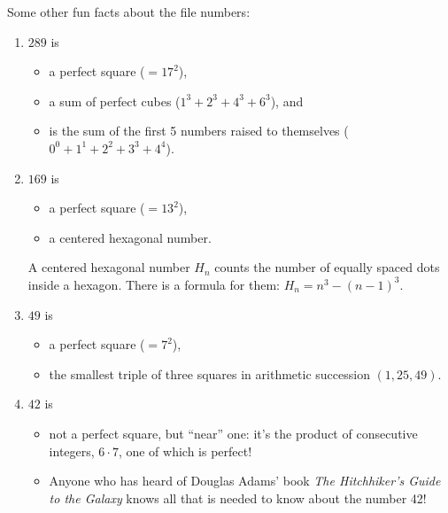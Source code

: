 \documentclass[12pt]{article}
\begin{document}
Some other fun facts about the file numbers:

\begin{enumerate}
\item
$289$ is
\begin{itemize}
\item
  a perfect square ($=17^2$),
\item
  a sum of perfect cubes ($1^3+2^3+4^3+6^3$), and
\item
  is the sum of the first 5 numbers raised to themselves
($0^0+1^1+2^2+3^3+4^4$).
\end{itemize}

\item
$169$ is
\begin{itemize}
\item
  a perfect square ($=13^2$),
\item  
  a centered hexagonal number.
\end{itemize}


\begin{center}
\end{center}
%
A centered hexagonal number $H_n$ counts the number of
  equally spaced dots inside a hexagon. There is a formula for them:
  $H_n = n^3-(n-1)^3$.

\item
$49$ is
\begin{itemize}
\item
  a perfect square ($=7^2$),
\item
  the smallest triple of three squares in arithmetic succession
  $(1,25,49)$.
\end{itemize}
\item
$42$ is 
\begin{itemize}
\item
  not a perfect square, but ``near'' one: it's the product of consecutive
  integers, $6\cdot 7$, one of which is perfect!
\item
  Anyone who has heard of Douglas Adams' book
{\it The Hitchhiker's Guide to the Galaxy} knows all that is needed to know
about the number 42!
\end{itemize}


\end{enumerate}
\end{document}

